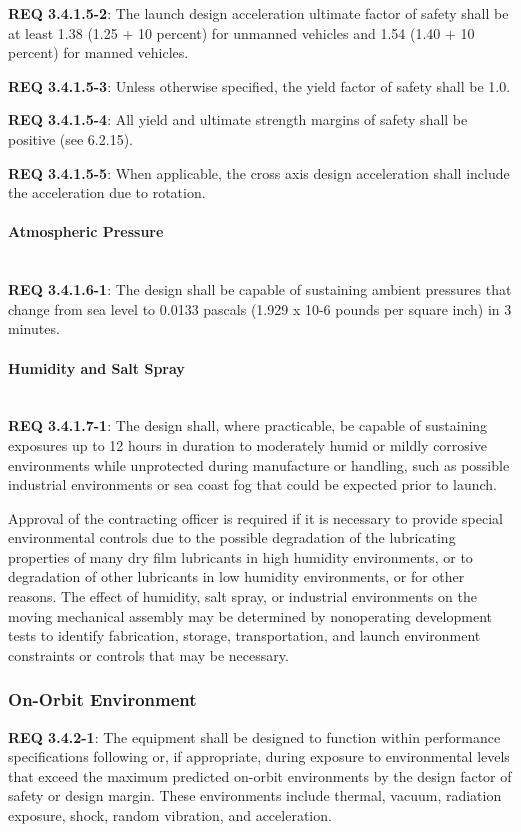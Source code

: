 \documentclass[12pt]{article}
\begin{document}
\noindent \textbf{REQ 3.4.1.5-2}: The launch design acceleration ultimate factor of safety shall be at least 1.38 (1.25 + 10 percent) for unmanned vehicles and 1.54 (1.40 + 10 percent) for manned vehicles. 

\noindent \textbf{REQ 3.4.1.5-3}: Unless otherwise specified, the yield factor of safety shall be 1.0. 

\noindent \textbf{REQ 3.4.1.5-4}: All yield and ultimate strength margins of safety shall be positive (see 6.2.15). 

\noindent \textbf{REQ 3.4.1.5-5}: When applicable, the cross axis design acceleration shall include the acceleration due to rotation.


\paragraph{Atmospheric Pressure} \mbox{} \\ %
\noindent \textbf{REQ 3.4.1.6-1}: The design shall be capable of sustaining ambient pressures that change from sea level to 0.0133 pascals (1.929 x 10-6 pounds per square inch) in 3 minutes.


\paragraph{Humidity and Salt Spray} \mbox{} \\ %
\noindent \textbf{REQ 3.4.1.7-1}: The design shall, where practicable, be capable of sustaining exposures up to 12 hours in duration to moderately humid or mildly corrosive environments while unprotected during manufacture or handling, such as possible industrial environments or sea coast fog that could be expected prior to launch. 

Approval of the contracting officer is required if it is necessary to provide special environmental controls due to the possible degradation of the lubricating properties of many dry film lubricants in high humidity environments, or to degradation of other lubricants in low humidity environments, or for other reasons. 
The effect of humidity, salt spray, or industrial environments on the moving mechanical assembly may be determined by nonoperating development tests to identify fabrication, storage, transportation, and launch environment constraints or controls that may be necessary.


\subsubsection{On-Orbit Environment} %
\noindent \textbf{REQ 3.4.2-1}: The equipment shall be designed to function within performance specifications following or, if appropriate, during exposure to environmental levels that exceed the maximum predicted on-orbit environments by the design factor of safety or design margin. 
These environments include thermal, vacuum, radiation exposure, shock, random vibration, and acceleration.
\end{document}
